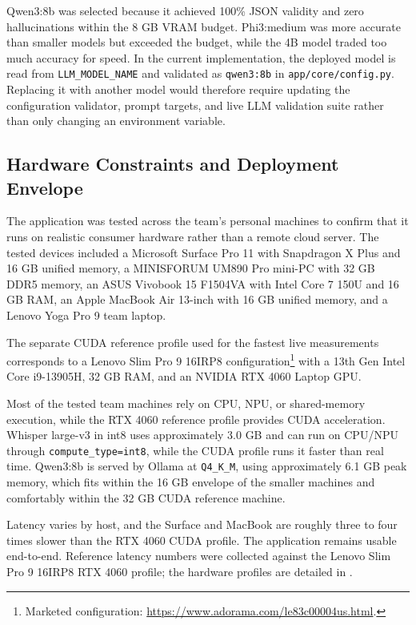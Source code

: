 Qwen3:8b was selected because it achieved 100\% JSON validity and zero hallucinations within the 8 GB VRAM budget. Phi3:medium was more accurate than smaller models but exceeded the budget, while the 4B model traded too much accuracy for speed. In the current implementation, the deployed model is read from \texttt{LLM\_MODEL\_NAME} and validated as \texttt{qwen3:8b} in \texttt{app/core/config.py}. Replacing it with another model would therefore require updating the configuration validator, prompt targets, and live LLM validation suite rather than only changing an environment variable.

\subsection{Hardware Constraints and Deployment Envelope}
\label{subsec:hardware-deployment-envelope}

The application was tested across the team's personal machines to confirm that it runs on realistic consumer hardware rather than a remote cloud server. The tested devices included a Microsoft Surface Pro 11 with Snapdragon X Plus and 16 GB unified memory, a MINISFORUM UM890 Pro mini-PC with 32 GB DDR5 memory, an ASUS Vivobook 15 F1504VA with Intel Core 7 150U and 16 GB RAM, an Apple MacBook Air 13-inch with 16 GB unified memory, and a Lenovo Yoga Pro 9 team laptop.

The separate CUDA reference profile used for the fastest live measurements corresponds to a Lenovo Slim Pro 9 16IRP8 configuration\footnote{Marketed configuration: \url{https://www.adorama.com/le83c00004us.html}.} with a 13th Gen Intel Core i9-13905H, 32 GB RAM, and an NVIDIA RTX 4060 Laptop GPU.

Most of the tested team machines rely on CPU, NPU, or shared-memory execution, while the RTX 4060 reference profile provides CUDA acceleration. Whisper large-v3 in int8 uses approximately 3.0 GB and can run on CPU/NPU through \texttt{compute\_type=int8}, while the CUDA profile runs it faster than real time. Qwen3:8b is served by Ollama at \texttt{Q4\_K\_M}, using approximately 6.1 GB peak memory, which fits within the 16 GB envelope of the smaller machines and comfortably within the 32 GB CUDA reference machine.

Latency varies by host, and the Surface and MacBook are roughly three to four times slower than the RTX 4060 CUDA profile. The application remains usable end-to-end. Reference latency numbers were collected against the Lenovo Slim Pro 9 16IRP8 RTX 4060 profile; the hardware profiles are detailed in .

